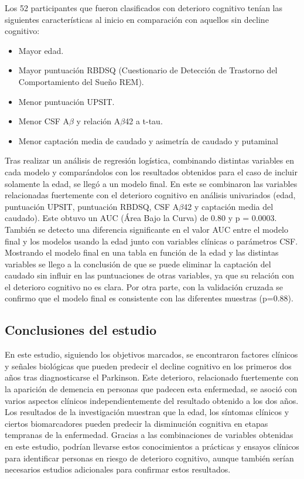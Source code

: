 	Los 52 participantes que fueron clasificados con deterioro cognitivo tenían las siguientes características al inicio en comparación con aquellos sin decline cognitivo:
	\begin{itemize}
		\item Mayor edad.
		\item Mayor puntuación RBDSQ (Cuestionario de Detección de Trastorno del Comportamiento del Sueño REM).
		\item Menor puntuación UPSIT.
		\item Menor CSF A$\beta$ y relación A$\beta$42 a t-tau.
		\item Menor captación media de caudado y
		asimetría de caudado y putaminal
	\end{itemize}	
	
	Tras realizar un análisis de regresión logística, combinando distintas variables en cada modelo y comparándolos con los resultados obtenidos para el caso de incluir solamente la edad, se llegó a un modelo final. En este se combinaron las variables relacionadas fuertemente con el deterioro cognitivo en análisis univariados (edad, puntuación UPSIT, puntuación RBDSQ, CSF A$\beta$42 y captación media del caudado). Este obtuvo un AUC (Área Bajo la Curva) de 0.80 y p = 0.0003. También se detecto una diferencia significante en el valor AUC entre el modelo final y los modelos usando la edad junto con variables clínicas o parámetros CSF. Mostrando el modelo final en una tabla en función de la edad y las distintas variables se llego a la conclusión de que se puede eliminar la captación del caudado sin influir en las puntuaciones de otras variables, ya que su relación con el deterioro cognitivo no es clara. Por otra parte, con la validación cruzada se confirmo que el modelo final es consistente con las diferentes muestras (p=0.88).\\
	
	\subsection{Conclusiones del estudio}
	
	En este estudio, siguiendo los objetivos marcados, se encontraron factores clínicos y señales biológicas que pueden predecir el decline cognitivo en los primeros dos años tras diagnosticarse el Parkinson. Este deterioro, relacionado fuertemente con la aparición de demencia en personas que padecen esta enfermedad, se asoció con varios aspectos clínicos independientemente del resultado obtenido a los dos años. Los resultados de la investigación muestran que la edad, los síntomas clínicos y ciertos biomarcadores pueden predecir la disminución cognitiva en etapas tempranas de la enfermedad. Gracias a las combinaciones de variables obtenidas en este estudio, podrían llevarse estos conocimientos a prácticas y ensayos clínicos para identificar personas en riesgo de deterioro cognitivo, aunque también serían necesarios estudios adicionales para confirmar estos resultados.\\
	
